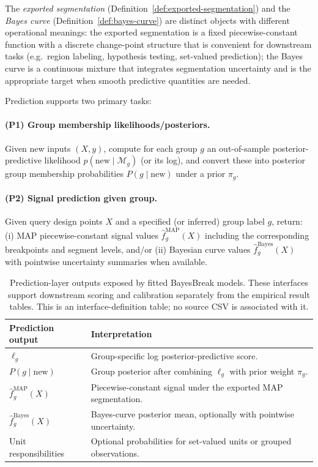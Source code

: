 The \emph{exported segmentation} (Definition~\ref{def:exported-segmentation}) and the
\emph{Bayes curve} (Definition~\ref{def:bayes-curve}) are distinct objects with different
operational meanings: the exported segmentation is a fixed piecewise-constant function with a
discrete change-point structure that is convenient for downstream tasks (e.g.\ region labeling,
hypothesis testing, set-valued prediction); the Bayes curve is a continuous mixture that integrates
segmentation uncertainty and is the appropriate target when smooth predictive quantities are needed.

Prediction supports two primary tasks:

\paragraph{(P1) Group membership likelihoods/posteriors.}
Given new inputs $(X,y)$, compute for each group $g$ an out-of-sample
posterior-predictive likelihood
$p(\text{new}\mid \mathcal{M}_g)$ (or its log), and convert these into posterior group
membership probabilities $P(g\mid \text{new})$ under a prior $\pi_g$.

\paragraph{(P2) Signal prediction given group.}
Given query design points $X$ and a specified (or inferred) group label $g$, return:
(i) MAP piecewise-constant signal values $\widehat{f}^{\text{MAP}}_g(X)$ including the
corresponding breakpoints and segment levels, and/or (ii) Bayesian curve values
$\widehat{f}^{\text{Bayes}}_g(X)$ with pointwise uncertainty summaries when available.

\begin{table}[H]
\centering
\small
\begin{tabular}{@{}ll@{}}
\toprule
Prediction output & Interpretation \\
\midrule
$\ell_g$ & Group-specific log posterior-predictive score. \\
$P(g\mid \mathrm{new})$ & Group posterior after combining $\ell_g$ with prior weight $\pi_g$. \\
$\widehat f^{\mathrm{MAP}}_g(X)$ & Piecewise-constant signal under the exported MAP segmentation. \\
$\widehat f^{\mathrm{Bayes}}_g(X)$ & Bayes-curve posterior mean, optionally with pointwise uncertainty. \\
Unit responsibilities & Optional probabilities for set-valued units or grouped observations. \\
\bottomrule
\end{tabular}
\caption[Prediction-layer outputs]{Prediction-layer outputs exposed by fitted BayesBreak models. These interfaces support downstream scoring and calibration separately from the empirical result tables. This is an interface-definition table; no source CSV is associated with it.}
\label{tab:prediction-outputs}
\end{table}

